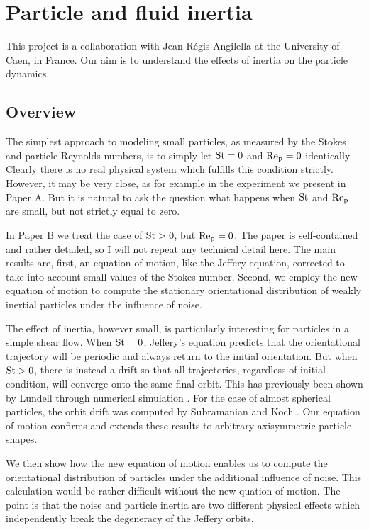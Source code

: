 \documentclass[thesis.tex]{subfiles}
\begin{document}
\chapter{Particle and fluid inertia}

This project is a collaboration with Jean-R\'egis Angilella at the University of Caen, in France. Our aim is to understand the effects of inertia on the particle dynamics.

\section{Overview}

The simplest approach to modeling small particles, as measured by the Stokes and particle Reynolds numbers, is to simply let $\mbox{St}=0$ and $\mbox{Re}_{\mathrm p}=0$ identically. Clearly there is no real physical system which fulfills this condition strictly. However, it may be very close, as for example in the experiment we present in Paper A. But it is natural to ask the question what happens when $\mbox{St}$ and $\mbox{Re}_{\mathrm p}$ are small, but not strictly equal to zero.

In Paper B we treat the case of $\mbox{St}>0$, but $\mbox{Re}_{\mathrm p}=0$. The paper is self-contained and rather detailed, so I will not repeat any technical detail here. The main results are, first, an equation of motion, like the Jeffery equation, corrected to take into account small values of the Stokes number. Second, we employ the new equation of motion to compute the stationary orientational distribution of weakly inertial particles under the influence of noise. 

The effect of inertia, however small, is particularly interesting for particles in a simple shear flow. When $\mbox{St}=0$, Jeffery's equation predicts that the orientational trajectory will be periodic and always return to the initial orientation. But when $\mbox{St}>0$, there is instead a drift so that all trajectories, regardless of initial condition, will converge onto the same final orbit. This has previously been shown by Lundell through numerical simulation \cite{lundell2010}. For the case of almost spherical particles, the orbit drift was computed by Subramanian and Koch \cite{subramanian2006}. Our equation of motion confirms and extends these results to arbitrary axisymmetric particle shapes.

We then show how the new equation of motion enables us to compute the orientational distribution of particles under the additional influence of noise. This calculation would be rather difficult without the new quation of motion. The point is that the noise and particle inertia are two different physical effects which independently break the degeneracy of the Jeffery orbits. 
\end{document}
